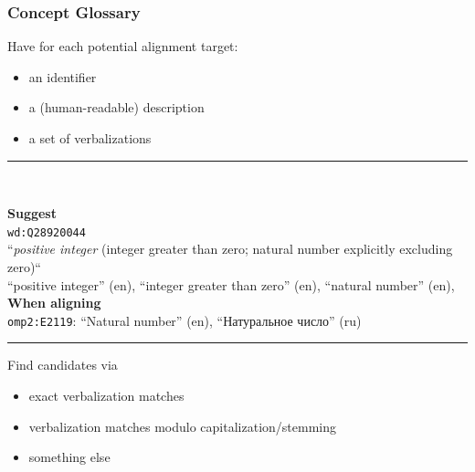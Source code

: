 \documentclass[aspectratio=169]{beamer}
\newcommand\cyr{\fontencoding{T2A}\selectfont} %
\def\texthl#1{\colorbox{yellow!50!red!70}{#1}}
\begin{document}
\begin{frame}[fragile]
    \frametitle{Concept Glossary}
    Have for each potential alignment target:
    \begin{itemize}
        \item an identifier
        \item a (human-readable) description
        \item a set of verbalizations
    \end{itemize}
    \pause
    \noindent\rule{\textwidth}{0.8pt}
    \\[0.3em]
    \begin{minipage}{1.1\textwidth}
    \textbf{Suggest}\\
    \quad\texttt{wd:Q28920044}\\
    \quad``\textit{positive integer} (integer greater than zero; natural number explicitly excluding zero)``\\
    \quad``positive integer'' (en), ``integer greater than zero'' (en), \texthl{``natural number''} (en), \textellipsis\\[0.3em]
    \textbf{When aligning}\\
    \quad\texttt{omp2:E2119}:
        \texthl{``Natural number''} (en), ``{\cyr Натуральное число}'' (ru)\\[-0.5em]
    \end{minipage}
    \noindent\rule{\textwidth}{0.8pt}
    Find candidates via
    \begin{itemize}
        \item exact verbalization matches
        \item verbalization matches modulo capitalization/stemming
        \item something else
    \end{itemize}
\end{frame}
\end{document}
